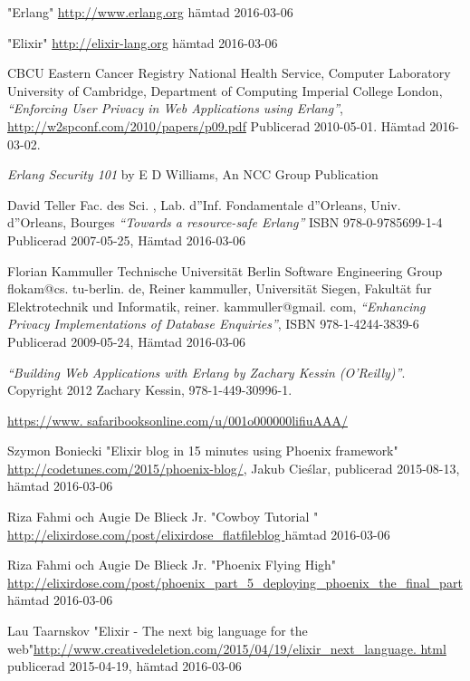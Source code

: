 \documentclass[12pt]{article}
\begin{document}
\begin{thebibliography}{99}

	"Erlang" \url{http://www.erlang.org}
hämtad 2016-03-06

"Elixir" \url{http://elixir-lang.org}
hämtad 2016-03-06

 CBCU Eastern Cancer Registry National Health Service, Computer Laboratory University of Cambridge, Department of Computing Imperial College London, {\em “Enforcing User Privacy in Web Applications using Erlang”}, \url{http://w2spconf.com/2010/papers/p09.pdf} Publicerad 2010-05-01.
 Hämtad 2016-03-02.


 {\em Erlang Security 101} by E D Williams, An NCC Group Publication


David Teller Fac.
 des Sci.
, Lab.
 d''Inf.
 Fondamentale d''Orleans, Univ.
 d''Orleans, Bourges {\em “Towards a resource-safe Erlang”} ISBN 978-0-9785699-1-4 Publicerad 2007-05-25, Hämtad 2016-03-06			
					
Florian Kammuller Technische Universität Berlin Software Engineering Group flokam@cs.
tu-berlin.
de, Reiner kammuller, Universität Siegen, Fakultät fur Elektrotechnik und Informatik, reiner.
kammuller@gmail.
com, {\em “Enhancing Privacy Implementations of Database Enquiries”}, ISBN 978-1-4244-3839-6 Publicerad 2009-05-24, Hämtad 2016-03-06


 {\em “Building Web Applications with Erlang by Zachary Kessin (O’Reilly)”}.
 Copyright 2012 Zachary Kessin, 978-1-449-30996-1.

\url{https://www.
safaribooksonline.com/u/001o000000lifiuAAA/}

 Szymon Boniecki "Elixir blog in 15 minutes using Phoenix framework" \url{http://codetunes.com/2015/phoenix-blog/}, Jakub Cieślar, publicerad 2015-08-13,
hämtad 2016-03-06

Riza Fahmi och Augie De Blieck Jr.
 "Cowboy Tutorial " \url{http://elixirdose.com/post/elixirdose_flatfileblog }
hämtad 2016-03-06

Riza Fahmi och Augie De Blieck Jr.
  "Phoenix Flying High" \url{http://elixirdose.com/post/phoenix_part_5_deploying_phoenix_the_final_part} 
hämtad 2016-03-06

 Lau Taarnskov "Elixir - The next big language for the web"\url{http://www.creativedeletion.com/2015/04/19/elixir_next_language.
html}
publicerad  2015-04-19,
hämtad 2016-03-06




\end{thebibliography}
\end{document}

